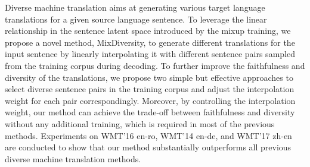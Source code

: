 Diverse machine translation aims at generating various target language translations for a given source language sentence. To leverage the linear relationship in the sentence latent space introduced by the mixup training, we propose a novel method, MixDiversity, to generate different translations for the input sentence by linearly interpolating it with different sentence pairs sampled from the training corpus during decoding. To further improve the faithfulness and diversity of the translations, we propose two simple but effective approaches to select diverse sentence pairs in the training corpus and adjust the interpolation weight for each pair correspondingly. Moreover, by controlling the interpolation weight, our method can achieve the trade-off between faithfulness and diversity without any additional training, which is required in most of the previous methods. Experiments on WMT'16 en-ro, WMT'14 en-de, and WMT'17 zh-en are conducted to show that our method substantially outperforms all previous diverse machine translation methods.
